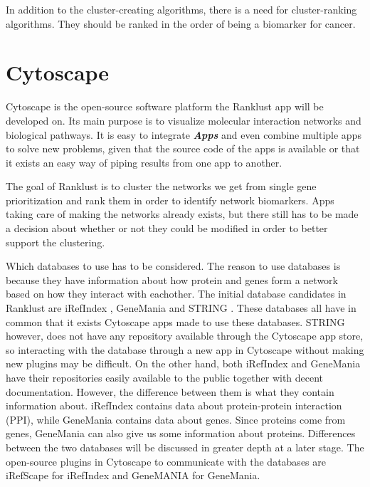 \documentclass[UKenglish,11pt,a4paper]{article}
\begin{document}
In addition to the cluster-creating algorithms, there is a need for cluster-ranking algorithms. They should be ranked in
the order of being a biomarker for cancer.
\section{Cytoscape}
Cytoscape is the open-source software platform the Ranklust app will be developed on. Its main purpose is to visualize
molecular interaction networks and biological pathways.  It is easy to integrate \textbf{\textit{Apps}} and even combine 
multiple apps to solve new problems, given that the source code of the apps is available or that it exists an easy way of 
piping results from one app to another. 

The goal of Ranklust is to cluster the networks we get from single gene prioritization and rank them in order to 
identify network biomarkers. Apps taking care of making the networks already exists, but there still has to be made a 
decision about whether or not they could be modified in order to better support the clustering.

Which databases to use has to be considered. The reason to use databases is because they have information about how 
protein and genes form a network based on how they interact with eachother. The initial database candidates in Ranklust 
are iRefIndex \cite{iri}, GeneMania \cite{gm} and STRING \cite{str}. These databases all have in common that it exists
Cytoscape apps made to use these databases. STRING however, does not have any repository available through the Cytoscape
app store, so interacting with the database through a new app in Cytoscape without making new plugins may be difficult.
On the other hand, both iRefIndex and GeneMania have their repositories easily available to the public together with
decent documentation. However, the difference between them is what they contain information about. iRefIndex contains
data about protein-protein interaction (PPI), while GeneMania contains data about genes.
Since proteins come from genes, GeneMania can also give us some information about proteins. Differences between the
two databases will be discussed in greater depth at a later stage.
The open-source plugins in Cytoscape to communicate with the databases are iRefScape \cite{iridb} for iRefIndex and 
GeneMANIA \cite{gmdb} for GeneMania.
\end{document}
